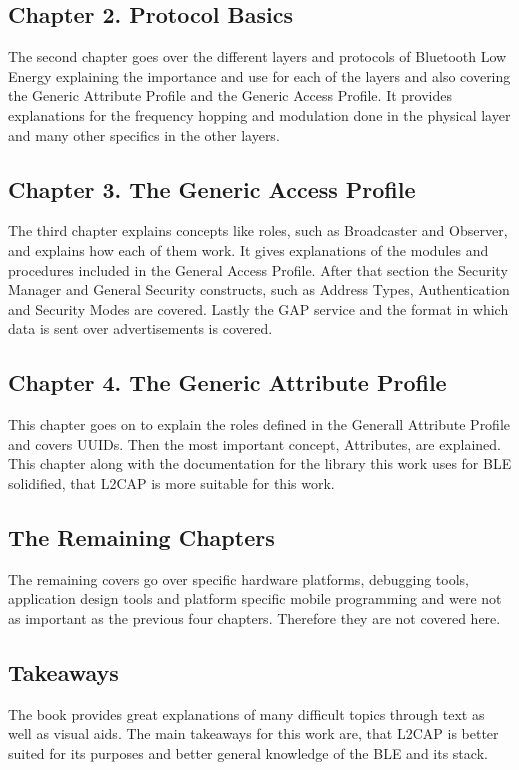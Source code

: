 \subsection{Chapter 2. Protocol Basics}
The second chapter goes over the different layers and protocols of Bluetooth Low Energy explaining the importance
and use for each of the layers and also covering the Generic Attribute Profile and the Generic Access Profile. It
provides explanations for the frequency hopping and modulation done in the physical layer and many other specifics
in the other layers.

\subsection{Chapter 3. The Generic Access Profile}
The third chapter explains concepts like roles, such as Broadcaster and Observer, and explains how each of them work.
It gives explanations of the modules and procedures included in the General Access Profile. After that section the Security
Manager and General Security constructs, such as Address Types, Authentication and Security Modes are covered. Lastly the GAP
service and the format in which data is sent over advertisements is covered.

\subsection{Chapter 4. The Generic Attribute Profile}
This chapter goes on to explain the roles defined in the Generall Attribute Profile and covers UUIDs.
Then the most important concept, Attributes, are explained. This chapter along with the documentation for the library this work uses for BLE solidified, that L2CAP is more suitable for this work. 

\subsection{The Remaining Chapters}
The remaining covers go over specific hardware platforms, debugging tools, application design tools and platform specific mobile
programming and were not as important as the previous four chapters. Therefore they are not covered here.

\subsection{Takeaways}
The book provides great explanations of many difficult topics through text as well as visual aids. The main takeaways for this work are, that L2CAP is better suited for its purposes and better general knowledge of the BLE and its stack.


\filbreak
